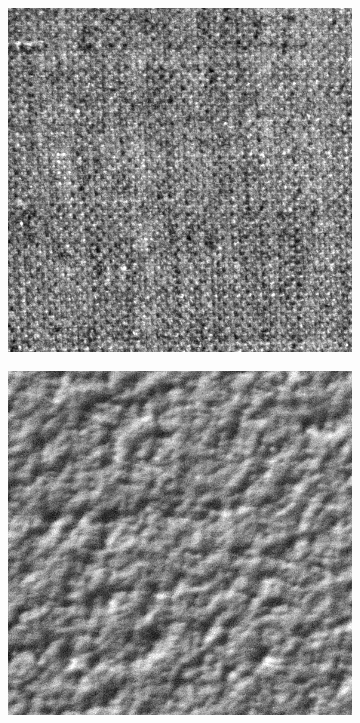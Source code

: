 \begin{figure}[H]
\begin{subfigure}{.15\textwidth}
  \includegraphics[width=.8\linewidth]{kylberg_examples/canvas1_002.png}
\end{subfigure}
\begin{subfigure}{.15\textwidth}
  \centering
  \includegraphics[width=.8\linewidth]{kylberg_examples/ceiling1_002.png}
\end{subfigure}%
\begin{subfigure}{.15\textwidth}
  \centering

\end{subfigure}
\end{figure}
